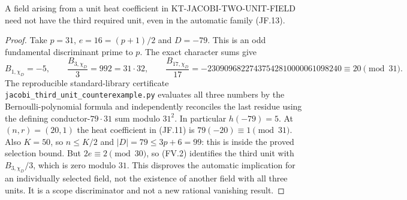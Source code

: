 \begin{proposition}
A field arising from a unit heat coefficient in
KT-JACOBI-TWO-UNIT-FIELD need not have the third required unit,
even in the automatic family (JF.13).
\end{proposition}
\begin{proof}
Take $p=31$, $e=16=(p+1)/2$ and $D=-79$.  This is an odd
fundamental discriminant prime to $p$.  The exact character sums give
\[
 B_{1,\chi_D}=-5,\qquad
 \frac{B_{3,\chi_D}}3=992=31\cdot32,\qquad
 \frac{B_{17,\chi_D}}{17}
       =-23090968227437542810000061098240
       \equiv20\pmod{31}.
\]
The reproducible standard-library certificate
\texttt{jacobi\_third\_unit\_counterexample.py} evaluates all three
numbers by the Bernoulli-polynomial formula and independently
reconciles the last residue using the defining conductor-$79\cdot31$
sum modulo $31^2$.  In particular $h(-79)=5$.
At $(n,r)=(20,1)$ the heat coefficient in (JF.11) is
$79(-20)\equiv1\pmod{31}$.  Also $K=50$, so $n\leq K/2$
and $|D|=79\leq3p+6=99$: this is inside the proved selection bound.
But $2e\equiv2\pmod{30}$, so (FV.2) identifies the third unit
with $B_{3,\chi_D}/3$, which is zero modulo $31$.
This disproves the automatic implication for an individually selected
field, not the existence of another field with all three units.
It is a scope discriminator and not a new rational vanishing result.
\end{proof}
